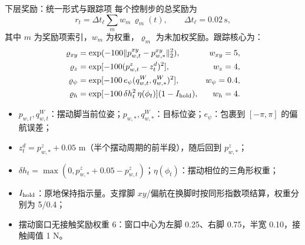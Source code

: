 \documentclass[aspectratio=169,10pt]{beamer}
\begin{document}
\begin{frame}{下层奖励：统一形式与跟踪项}
\scriptsize
每个控制步的总奖励为
\[
r_t=\Delta t_\ell\sum_m w_m\,\varrho_m(t),\qquad \Delta t_\ell=0.02\ \mathrm{s},
\]
其中 $m$ 为奖励项索引，$w_m$ 为权重，$\varrho_m$ 为未加权奖励。跟踪核心为：
\begin{align*}
\varrho_{xy}&=\exp(-100\|p^{xy}_{w,t}-p^{xy}_{w,*}\|_2^2), &w_{xy}=5,\\
\varrho_z&=\exp[-100(p^z_{w,t}-z^d_t)^2], &w_z=4,\\
\varrho_\psi&=\exp[-100\,e_\psi(q^W_{w,t},q^W_{w,*})^2], &w_\psi=0.4,\\
\varrho_h&=\exp[-100\,\delta h_t^2\,\eta(\phi_t)](1-I_{\rm hold}), &w_h=4.
\end{align*}
\begin{itemize}
  \item $p_{w,t},q^W_{w,t}$：摆动脚当前位姿；$p_{w,*},q^W_{w,*}$：目标位姿；$e_\psi$：包裹到 $[-\pi,\pi]$ 的偏航误差；
  \item $z^d_t=p^z_{w,*}+0.05$ m（半个摆动周期的前半段），随后回到 $p^z_{w,*}$；
  \item $\delta h_t=\max(0,p^z_{w,*}+0.05-p^z_{w,t})$；$\eta(\phi_t)$：摆动相位的三角形权重；
  \item $I_{\rm hold}$：原地保持指示量。支撑脚 $xy$/偏航在换脚时按同形指数项结算，权重分别为 5/0.4；
  \item 摆动窗口无接触奖励权重 6：窗口中心为左脚 0.25、右脚 0.75，半宽 0.10，接触阈值 1 N。
\end{itemize}
\end{frame}
\end{document}
